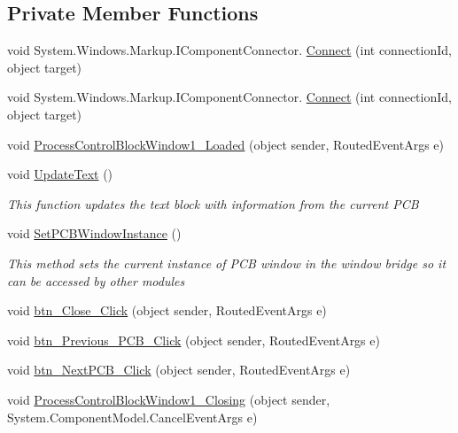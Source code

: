 \subsection*{Private Member Functions}
\begin{DoxyCompactItemize}
\item 
void System.\+Windows.\+Markup.\+I\+Component\+Connector. \hyperlink{class_c_p_u___o_s___simulator_1_1_process_control_block_window_aacad273b08eb9ad7e92c47eb5493008b}{Connect} (int connection\+Id, object target)
\item 
void System.\+Windows.\+Markup.\+I\+Component\+Connector. \hyperlink{class_c_p_u___o_s___simulator_1_1_process_control_block_window_aacad273b08eb9ad7e92c47eb5493008b}{Connect} (int connection\+Id, object target)
\item 
void \hyperlink{class_c_p_u___o_s___simulator_1_1_process_control_block_window_a18ccb30540f400cf07a224304c882c32}{Process\+Control\+Block\+Window1\+\_\+\+Loaded} (object sender, Routed\+Event\+Args e)
\item 
void \hyperlink{class_c_p_u___o_s___simulator_1_1_process_control_block_window_a9bb10e14d5a7e732ce6e5e5e0f66b678}{Update\+Text} ()
\begin{DoxyCompactList}\small\item\em This function updates the text block with information from the current P\+C\+B \end{DoxyCompactList}\item 
void \hyperlink{class_c_p_u___o_s___simulator_1_1_process_control_block_window_aa2c224432467974c6cf46c83a01735fa}{Set\+P\+C\+B\+Window\+Instance} ()
\begin{DoxyCompactList}\small\item\em This method sets the current instance of P\+C\+B window in the window bridge so it can be accessed by other modules \end{DoxyCompactList}\item 
void \hyperlink{class_c_p_u___o_s___simulator_1_1_process_control_block_window_a3b65012264c411aa3524bfb9b1e6bfe5}{btn\+\_\+\+Close\+\_\+\+Click} (object sender, Routed\+Event\+Args e)
\item 
void \hyperlink{class_c_p_u___o_s___simulator_1_1_process_control_block_window_a071ef7272a71ad3a0004c70bbcc4ad0a}{btn\+\_\+\+Previous\+\_\+\+P\+C\+B\+\_\+\+Click} (object sender, Routed\+Event\+Args e)
\item 
void \hyperlink{class_c_p_u___o_s___simulator_1_1_process_control_block_window_a752d089879e7d6aa80faef5ffc5f68cd}{btn\+\_\+\+Next\+P\+C\+B\+\_\+\+Click} (object sender, Routed\+Event\+Args e)
\item 
void \hyperlink{class_c_p_u___o_s___simulator_1_1_process_control_block_window_aa3a9ed3c96ca8fac5e6cbee7daa49a73}{Process\+Control\+Block\+Window1\+\_\+\+Closing} (object sender, System.\+Component\+Model.\+Cancel\+Event\+Args e)
\end{DoxyCompactItemize}
